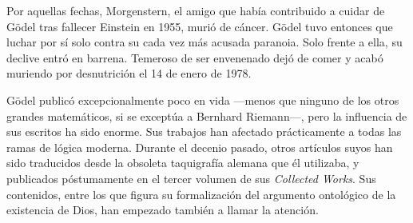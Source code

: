 \documentclass[a4paper, 12pt]{article}
\begin{document}
Por aquellas fechas, Morgenstern, el amigo que había contribuido a cuidar de Gödel tras fallecer Einstein en 1955, murió de cáncer. Gödel tuvo entonces que luchar por sí solo contra su cada vez más acusada paranoia. Solo frente a ella, su declive entró en barrena. Temeroso de ser envenenado dejó de comer y acabó muriendo por desnutrición el 14 de enero de 1978.

Gödel publicó excepcionalmente poco en vida ---menos que ninguno de los otros grandes matemáticos, si se exceptúa a Bernhard Riemann---, pero la influencia de sus escritos ha sido enorme. Sus trabajos han afectado prácticamente a todas las ramas de lógica moderna. Durante el decenio pasado, otros artículos suyos han sido traducidos desde la obsoleta taquigrafía alemana que él utilizaba, y publicados póstumamente en el tercer volumen de sus {\it Collected Works}. Sus contenidos, entre los que figura su formalización del argumento ontológico de la existencia de Dios, han empezado también a llamar la atención.
\end{document}
